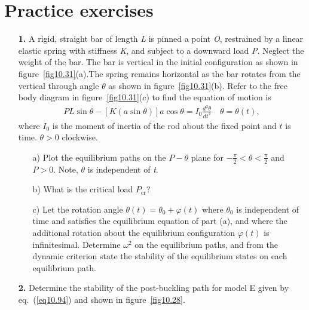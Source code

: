 \documentclass{AeroStructure-ERJohnson}
\begin{document}
\def\rightmark{Practice exercises}

\section{Practice exercises}\label{sec10.8}

\begin{exercise}
\begin{enumerate}[\textbf{2.}]
\item[\textbf{1.}] A rigid, straight bar of length \textit{L} is pinned a point \textit{O}, restrained by a linear elastic spring with stiffness \textit{K}, and subject to a downward load \textit{P}. Neglect the weight of the bar. The bar is vertical in the initial configuration as shown in figure~\ref{fig10.31}(a).The spring remains horizontal as the bar rotates from the vertical through angle $\theta$ as shown in figure~\ref{fig10.31}(b). Refer to the free body diagram in figure~\ref{fig10.31}(c) to find the equation of motion is\vspace*{-0.5pc}
\begin{align}\label{eq10.100}
P L \sin \theta-[K(a \sin \theta)] a \cos \theta=I_{0} \frac{d^{2} \theta}{d t^{2}} \quad \theta=\theta(t),
\end{align}
where ${I_0}$ is the moment of inertia of the rod about the fixed point and $t$ is time. $\theta>0$ clockwise.
\begin{enumerate}[b)]
  \item[{\hskip13pt}a)] Plot the equilibrium paths on the $P-\theta$ plane for $-\frac{\pi}{2}<\theta<\frac{\pi}{2}$ and ${P > }0$. Note, $\theta$ is independent of \textit{t}.
  \item[{\hskip13pt}b)] What is the critical load $P_{\mathrm{cr}}$?
  \item[{\hskip13pt}c)] Let the rotation angle $\theta(t)=\theta_{0}+\varphi(t)$ where $\theta_{0}$ is independent of time and satisfies the equilibrium equation of part (a), and where the additional rotation about the equilibrium configuration $\varphi(t)$ is infinitesimal. Determine $\omega^{2}$ on the equilibrium paths, and from the dynamic criterion state the stability of the equilibrium states on each equilibrium path.
\end{enumerate}

{\def\thefigure{10.31}
}


\item[\textbf{2.}] Determine the stability of the post-buckling path for model E given by eq.~(\ref{eq10.94}) and shown in figure~\ref{fig10.28}.
\end{enumerate}
\end{exercise}

\clearemptydoublepage
\end{document}
